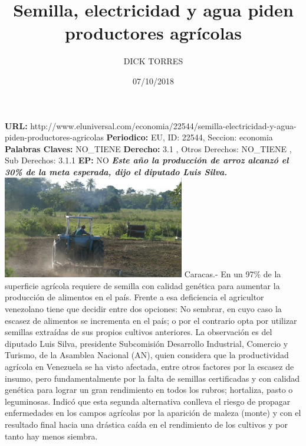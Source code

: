 \documentclass{article}%
\title{\textbf{Semilla, electricidad y agua piden productores agrícolas}}%
\author{DICK TORRES}%
\date{07/10/2018}%
\begin{document}
%
\normalsize%
\maketitle%
\textbf{URL: }%
http://www.eluniversal.com/economia/22544/semilla{-}electricidad{-}y{-}agua{-}piden{-}productores{-}agricolas\newline%
%
\textbf{Periodico: }%
EU, %
ID: %
22544, %
Seccion: %
economia\newline%
%
\textbf{Palabras Claves: }%
NO\_TIENE\newline%
%
\textbf{Derecho: }%
3.1%
, Otros Derechos: %
NO\_TIENE%
, Sub Derechos: %
3.1.1%
\newline%
%
\textbf{EP: }%
NO\newline%
\newline%
%
\textbf{\textit{Este año la producción de arroz alcanzó el 30\% de la meta esperada, dijo el diputado Luis Silva.}}%
\newline%
\newline%
%
\includegraphics[width=300px]{83.jpg}%
\newline%
%
Caracas.{-} En un 97\% de la superficie agrícola requiere de semilla con calidad genética para aumentar la producción de alimentos en el país.%
\newline%
%
Frente a esa deficiencia el agricultor venezolano tiene que decidir entre dos opciones: No sembrar, en cuyo caso la escasez de alimentos se incrementa en el país; o por el contrario  opta por utilizar semillas extraídas de sus propios cultivos anteriores.%
\newline%
%
La observación es del diputado Luis Silva, presidente Subcomisión Desarrollo Industrial, Comercio y Turismo, de la Asamblea Nacional (AN), quien considera que la productividad agrícola en Venezuela se ha visto afectada, entre otros factores por la escasez de insumo, pero fundamentalmente por la falta de semillas certificadas y con calidad genética para lograr un gran rendimiento en todos los rubros; hortaliza, pasto o leguminosas.%
\newline%
%
Indicó que esta segunda alternativa conlleva el riesgo de propagar enfermedades en los campos agrícolas por la aparición de maleza (monte) y con el resultado final hacia una drástica  caída en el rendimiento de los cultivos y por tanto hay menos siembra.%
\end{document}
